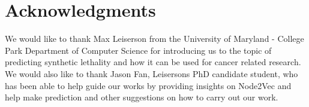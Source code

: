 \section*{Acknowledgments}

We would like to thank Max Leiserson from the University of Maryland - College Park Department of
Computer Science for introducing us to the topic of predicting synthetic lethality and how it can be
used for cancer related research. We would also like to thank Jason Fan, Leiserson\textquotesingle s
PhD candidate
student, who has been able to help guide our works by providing insights on Node2Vec and help make prediction and other suggestions on how to carry out our work.  


